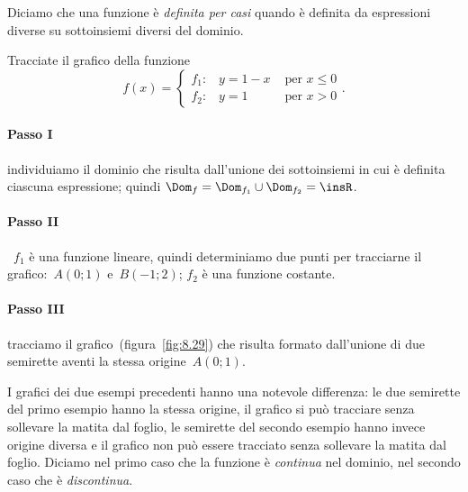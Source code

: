 \begin{definizione}
Diciamo che una funzione è \emph{definita per casi} quando è definita da espressioni diverse su sottoinsiemi diversi del dominio.
\end{definizione}
\begin{exrig}
 \begin{esempio}
 \label{ex:8.28}
Tracciate il grafico della funzione
\[
f(x)=\begin{cases}
f_{1}\text{:}\quad y=1-x & \text{ per }x\le 0\\
f_{2}\text{:}\quad y=1 & \text{ per }x>0
\end{cases}.
\]

\paragraph{Passo I} individuiamo il dominio che risulta dall'unione dei sottoinsiemi in cui è definita ciascuna espressione; quindi
$\Dom_{f}=\Dom_{f_1}\cup \Dom_{f_2}=\insR$.

\paragraph{Passo II} ~$f_1$ è una funzione lineare, quindi determiniamo due punti per tracciarne il grafico:~$A(0;1)$ e~$B(-1;2)$;
$f_2$ è una funzione costante.

\paragraph{Passo III} tracciamo il grafico~(figura~\ref{fig:8.29}) che risulta formato dall'unione di due semirette aventi la stessa origine~$A(0;1)$.
 \end{esempio}
\end{exrig}


\osservazione I grafici dei due esempi precedenti hanno una notevole differenza:
le due semirette del primo esempio hanno la stessa origine, il grafico si può tracciare senza sollevare la matita dal foglio,
le semirette del secondo esempio hanno invece origine diversa e il grafico non può essere tracciato senza sollevare la matita dal foglio.
Diciamo nel primo caso che la funzione è \emph{continua} nel dominio, nel secondo caso che è \emph{discontinua}.

